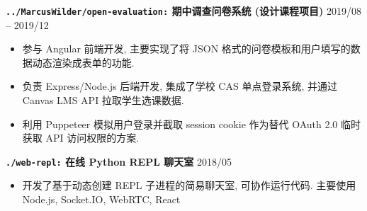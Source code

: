 \documentclass[10 pt]{article}
\begin{document}
\textbf{\texttt{../MarcusWilder/open-evaluation:} 期中调查问卷系统 (设计课程项目)} \hfill 2019/08 -- 2019/12
\begin{itemize}
\item 参与 Angular 前端开发, 主要实现了将 JSON 格式的问卷模板和用户填写的数据动态渲染成表单的功能.
\item 负责 Express/Node.js 后端开发, 集成了学校 CAS 单点登录系统, 并通过 Canvas LMS API 拉取学生选课数据.
\item 利用 Puppeteer 模拟用户登录并截取 session cookie 作为替代 OAuth 2.0 临时获取 API 访问权限的方案.
\end{itemize}

\textbf{\texttt{./web-repl:} 在线 Python REPL 聊天室}  \hfill 2018/05 
\begin{itemize}
\item 开发了基于动态创建 REPL 子进程的简易聊天室, 可协作运行代码. 主要使用 Node.js, Socket.IO, WebRTC, React
\end{itemize}
\end{document}
